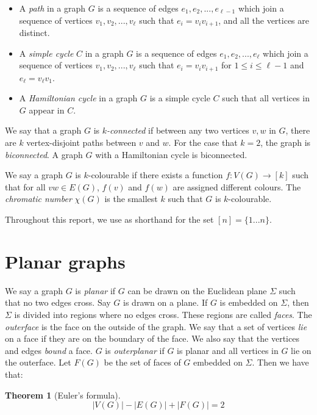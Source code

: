 \documentclass[]{report}
\newtheorem{theorem}{Theorem}
\theoremstyle{definition}
\numberwithin{theorem}{section}
\numberwithin{equation}{section}
\begin{document}
\begin{itemize}
	\item A \textit{path} in a graph $G$ is a sequence of edges $e_1, e_2, ..., e_{\ell- 1}$ which join a sequence of vertices $v_1, v_2, ..., v_{\ell}$ such that $e_i = v_iv_{i + 1}$, and all the vertices are distinct. 
	\item A \textit{simple cycle} $C$ in a graph $G$ is a sequence of edges $e_1, e_2, ..., e_{\ell}$ which join a sequence of vertices $v_1, v_2, ..., v_{\ell}$ such that $e_i = v_iv_{i + 1}$ for $1 \leq i \leq \ell - 1$ and $e_\ell = v_\ell v_1$. 
	\item A \textit{Hamiltonian cycle} in a graph $G$ is a simple cycle $C$ such that all vertices in $G$ appear in $C$.
\end{itemize}

We say that a graph $G$ is \textit{$k$-connected} if between any two vertices $v, w$ in $G$, there are $k$ vertex-disjoint paths between $v$ and $w$. For the case that $k = 2$, the graph is \textit{biconnected}. A graph $G$ with a Hamiltonian cycle is biconnected. 

We say a graph $G$ is $k$-colourable if there exists a function $f: V(G) \rightarrow [k]$ such that for all $vw \in E(G)$, $f(v)$ and $f(w)$ are assigned different colours. The \textit{chromatic number} $\chi(G)$ is the smallest $k$ such that $G$ is $k$-colourable. 

Throughout this report, we use as shorthand for the set $[n] = \lbrace 1... n \rbrace$. 

\section{Planar graphs}\label{sec:Planar graphs}
We say a graph $G$ is \textit{planar} if $G$ can be drawn on the Euclidean plane $\Sigma$ such that no two edges cross. Say $G$ is drawn on a plane. If $G$ is embedded on $\Sigma$, then $\Sigma$ is divided into regions where no edges cross. These regions are called \textit{faces}. The \textit{outerface} is the face on the outside of the graph. We say that a set of vertices \textit{lie} on a face if they are on the boundary of the face. We also say that the vertices and edges \textit{bound} a face. $G$ is \textit{outerplanar} if $G$ is planar and all vertices in $G$ lie on the outerface. 
Let $F(G)$ be the set of faces of $G$ embedded on $\Sigma$. Then we have that:
\begin{theorem}[Euler's formula]\label{thm:Euler_planar}
	\begin{equation}
		|V(G)| - |E(G)| + |F(G)| = 2
	\end{equation}
\end{theorem}
\end{document}
